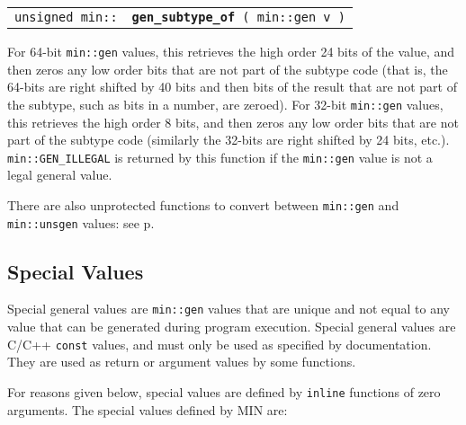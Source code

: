 \documentclass[12pt]{article}
\makeatletter
\newcommand{\ttindex}[1]{\index{#1@{\tt #1}}}
\newcommand{\minindex}[1]{\ttindex{min::#1}\ttindex{#1}}
\newcommand{\pagref}[1]{p\pageref{#1}}
\newcommand{\EOL}{\penalty \exhyphenpenalty}
\newenvironment{indpar}[1][0.3in]%
	{\begin{list}{}%
		     {\setlength{\itemsep}{0in}%
		      \setlength{\topsep}{0in}%
		      \setlength{\parsep}{1ex}%
		      \setlength{\labelwidth}{#1}%
		      \setlength{\leftmargin}{#1}%
		      \addtolength{\leftmargin}{\labelsep}}%
	 \item}%
	{\end{list}}
\newcommand{\LABEL}[1]{\label{#1}}
\newcommand{\MINKEY}[1]{{\tt \bf #1}\minindex{#1}}
\makeatother
\begin{document}
\begin{indpar}\begin{tabular}{r@{}l}
\verb|unsigned min::| & \MINKEY{gen\_subtype\_of}\verb| ( min::gen v )|
\LABEL{MIN::GEN_SUBTYPE_OF} \\
\end{tabular}\end{indpar}

For 64-bit \verb|min::gen| values, this retrieves the high order
24 bits of the value, and then zeros any low order bits that are not
part of the subtype code (that is, the 64-bits are right shifted by
40 bits and then bits of the result that are not part of the
subtype, such as bits in a number, are zeroed).
For 32-bit \verb|min::gen| values, this retrieves
the high order 8 bits, and then zeros any low order bits that are not
part of the subtype code (similarly the 32-bits are right shifted by
24 bits, etc.).
\verb|min::GEN_ILLEGAL| is returned by this function if the \verb|min::gen|
value is not a legal general value.

There are also unprotected functions to convert between
{\tt min::\EOL gen} and {\tt min::\EOL unsgen} values:
see \pagref{MUP::NEW_GEN}.

\subsection{Special Values}
\label{SPECIAL-VALUES}

Special general values are \verb|min::gen| values that are unique
and not equal to any value that can be generated during
program execution.  Special general values are C/C++ {\tt const}
values, and must only be used as specified by documentation.
They are used as return or argument values by some functions.

For reasons given below, special values are defined by {\tt inline}
functions of zero arguments.
The special values defined by MIN are:
\end{document}

